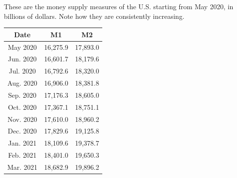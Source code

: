 \documentclass{article}
\begin{document}
    \begin{example}
      \label{ex:u-s-monthly-money-supply-measures}
      These are the money supply measures of the U.S. starting from May 2020, in billions of dollars. Note how they are consistently increasing. 
      \begin{center}
      \begin{tabular}{c|c|c}
        Date & M1 & M2 \\
        \hline
        May 2020 & 16,275.9&17,893.0\\
        Jun. 2020 & 16,601.7&18,179.6\\	
        Jul. 2020 & 16,792.6&18,320.0\\
        Aug. 2020 & 16,906.0&18,381.8\\
        Sep. 2020 & 17,176.3&18,605.0\\
        Oct. 2020 & 17,367.1&18,751.1\\
        Nov. 2020 & 17,610.0&18,960.2\\
        Dec. 2020 & 17,829.6&19,125.8\\
        Jan. 2021 & 18,109.6&19,378.7\\
        Feb. 2021 & 18,401.0&19,650.3\\
        Mar. 2021 & 18,682.9&19,896.2
      \end{tabular}
      \end{center}
    \end{example}
\end{document}

